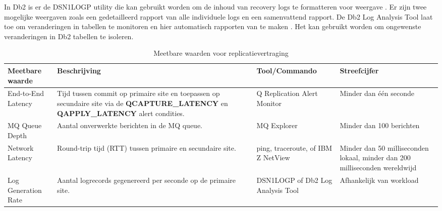In Db2 is er de DSN1LOGP utility die kan gebruikt worden om de inhoud van recovery logs te formatteren voor weergave \autocite{ibm_2026_db2_DSN1LOGP}. 
Er zijn twee mogelijke weergaven zoals een gedetailleerd rapport van alle individuele logs en een samenvattend rapport.
De Db2 Log Analysis Tool laat toe om veranderingen in tabellen te monitoren en hier automatisch rapporten van te maken \autocite{ibm_2025_ibm_log_analysis_tool}. 
Het kan gebruikt worden om ongewenste veranderingen in Db2 tabellen te isoleren.

\begin{table}[h]
\centering
\begin{tabularx}{\textwidth}{|p{2cm}|p{4cm}|p{4cm}|X|}
\hline
\textbf{Meetbare waarde} & \textbf{Beschrijving} & \textbf{Tool/Commando} & \textbf{Streefcijfer} \\
\hline
End-to-End Latency & Tijd tussen commit op primaire site en toepassen op secundaire site via de \textbf{QCAPTURE\_LATENCY} en \textbf{QAPPLY\_LATENCY} alert condities. & Q Replication Alert Monitor & Minder dan één seconde \\
\hline
MQ Queue Depth & Aantal onverwerkte berichten in de MQ queue. & MQ Explorer & Minder dan 100 berichten \\
\hline
Network Latency & Round-trip tijd (RTT) tussen primaire en secundaire site. & ping, traceroute, of IBM Z NetView & Minder dan 50 milliseconden lokaal, minder dan 200 milliseconden wereldwijd \\
\hline
Log Generation Rate & Aantal logrecords gegenereerd per seconde op de primaire site. & DSN1LOGP of Db2 Log Analysis Tool & Afhankelijk van workload \\
\hline
\end{tabularx}
\caption{Meetbare waarden voor replicatievertraging}
\label{tab:q_replication_metrics}
\end{table}

\subsubsection{}
\label{sec:asynchrone-log-replicatie-impact-replicatievertraging}


